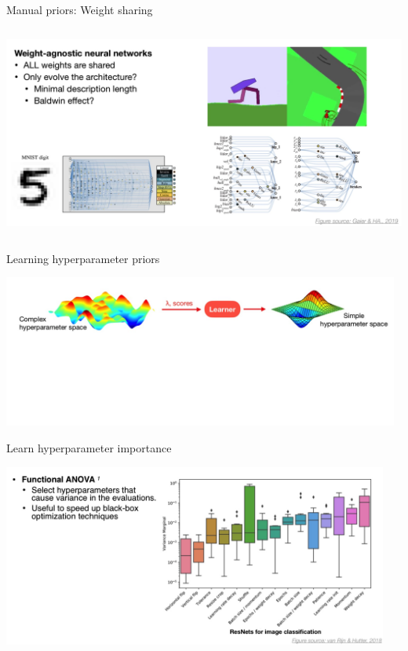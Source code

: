 \begin{frame}{Manual priors: Weight sharing}

\centering\includegraphics[height=7cm]{image/img200845.jpg}


\end{frame}
\begin{frame}{Learning hyperparameter priors}

\centering\includegraphics[height=5cm]{image/img200954.jpg}


\end{frame}
\begin{frame}{Learn hyperparameter importance}

\centering\includegraphics[height=6cm]{image/img201111.jpg}


\end{frame}
